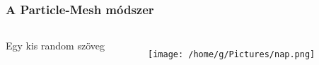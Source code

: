 \documentclass[aspectratio=169]{beamer}
\begin{document}
\begin{frame}
	\frametitle{A Particle-Mesh módszer}
	\begin{columns}
			Egy kis random szöveg
			\begin{figure}
				\texttt{[image: /home/g/Pictures/nap.png]}
			\end{figure}
	\end{columns}
\end{frame}
\end{document}
